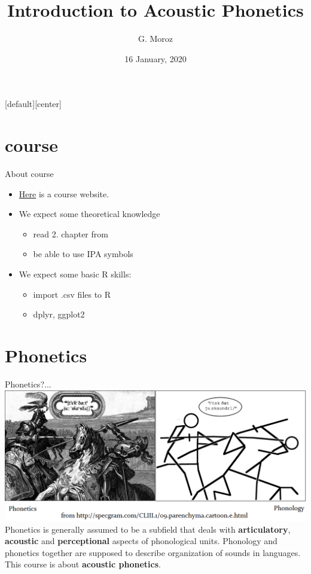 
[default][center]
\title[]{Introduction to Acoustic Phonetics}
\author[]{G. Moroz}
\date{16 January, 2020}

\frame{\titlepage}
\section{course}
\begin{frame}{About course}
\begin{itemize}
\item \href{https://agricolamz.github.io/2020_HSE_m_Instrumental_phonetics/}{Here} is a course website.
\item We expect some theoretical knowledge
\begin{itemize}
\item read 2. chapter from \citep{gussenhoven11}
\item be able to use IPA symbols
\end{itemize}
\item We expect some basic R skills:
\begin{itemize}
\item import .csv files to R
\item dplyr, ggplot2
\end{itemize}
\end{itemize}
\end{frame}
\section{Phonetics}
\begin{frame}{Phonetics?...}
\includegraphics[width=\linewidth]{03-Phonetics-vs-Phonology.png}\\
Phonetics is generally assumed to be a subfield that deals with \textbf{articulatory}, \textbf{acoustic} and \textbf{perceptional} aspects of phonological units. Phonology and phonetics together are supposed to describe organization of sounds in languages. \bigskip\\
This course is about \textbf{acoustic  phonetics}.

\end{frame}
